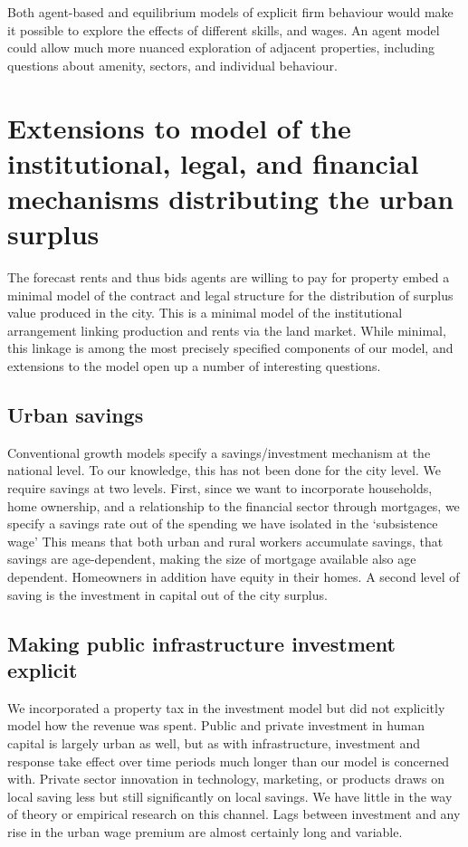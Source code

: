 Both agent-based and equilibrium models of explicit firm behaviour would make it possible to explore the effects of different skills, and wages. An agent model could allow much more nuanced exploration of adjacent properties, including questions about amenity, sectors, and individual behaviour. 

\section{Extensions to model of the institutional, legal, and financial mechanisms distributing the urban surplus}
The forecast rents and thus bids agents are willing to pay for property embed a minimal model of the contract and legal structure for the distribution of surplus value produced in the city. This is a minimal model of the institutional arrangement linking production and rents via the land market. While minimal, this linkage is among the most precisely specified components of our model, and extensions to the model open up a number of interesting questions. 


\subsection{Urban savings}
Conventional growth models specify a savings/investment mechanism at the national level. To our knowledge, this has not been done for the city level. We require savings at two levels. First, since we want to incorporate households, home ownership, and a relationship to the financial sector through mortgages, we specify a savings rate out of the spending we have isolated in the `subsistence wage' This means that both urban and rural workers accumulate savings, that savings are age-dependent, making the size of mortgage available also age dependent. 
Homeowners in addition have equity %
in their homes. %
{A second level of saving is the investment in capital out of the city surplus.} %

\subsection{Making public infrastructure investment explicit}
We incorporated a property tax in the investment model but did not explicitly model how the revenue was spent. Public and private investment in human capital is largely urban as well, but as with infrastructure, investment and response take effect over time periods much longer than our model is concerned with. Private sector innovation in technology, marketing, or products draws on local saving less but still significantly on local savings. We have little in the way of theory or empirical research on this channel. Lags between investment and any rise in the urban wage premium are almost certainly long and variable. 

